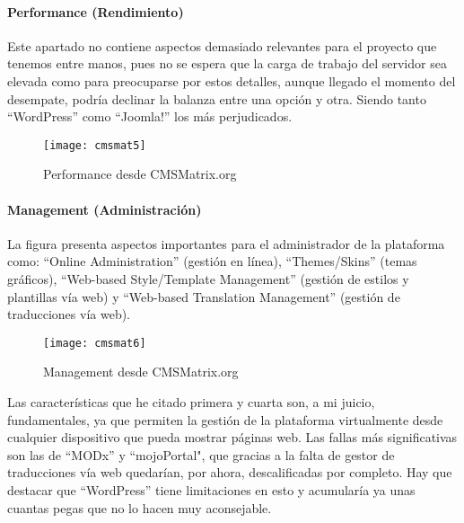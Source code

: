 \paragraph{Performance (Rendimiento)}

\par Este apartado no contiene aspectos demasiado relevantes para el proyecto que tenemos entre manos, pues no se espera que la carga de trabajo del servidor sea elevada como para preocuparse por estos detalles, aunque llegado el momento del desempate, podría declinar la balanza entre una opción y otra. Siendo tanto ``WordPress'' como ``Joomla!'' los más perjudicados.

\begin{figure}
\begin{narrow}{-0.12\linewidth}{-0.12\linewidth}
\centering
\texttt{[image: cmsmat5]}
\caption{Performance desde CMSMatrix.org}
\end{narrow}
\label{fig:cmsmat5}
\end{figure}


\paragraph{Management (Administración)}

\par La figura presenta aspectos importantes para el administrador de la plataforma como: ``Online Administration'' (gestión en línea), ``Themes/Skins'' (temas gráficos), ``Web-based Style/Template Management'' (gestión de estilos y plantillas vía web) y ``Web-based Translation Management'' (gestión de traducciones vía web).

\begin{figure}
\begin{narrow}{-0.12\linewidth}{-0.12\linewidth}
\centering
\texttt{[image: cmsmat6]}
\caption{Management desde CMSMatrix.org}
\end{narrow}
\label{fig:cmsmat6}
\end{figure}

\par Las características que he citado primera y cuarta son, a mi juicio, fundamentales, ya que permiten la gestión de la plataforma virtualmente desde cualquier dispositivo que pueda mostrar páginas web. Las fallas más significativas son las de ``MODx'' y ``mojoPortal", que gracias a la falta de gestor de traducciones vía web quedarían, por ahora, descalificadas por completo. Hay que destacar que ``WordPress'' tiene limitaciones en esto y acumularía ya unas cuantas pegas que no lo hacen muy aconsejable.


